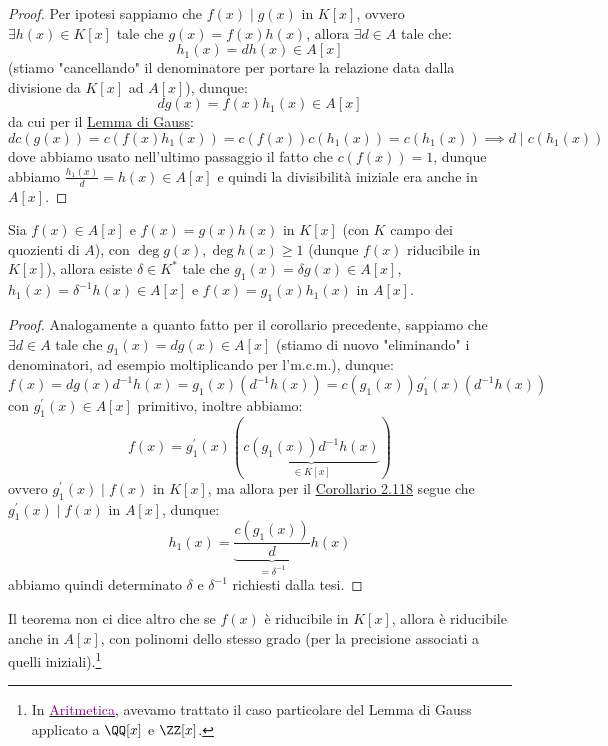 \documentclass[11pt]{scrartcl}
\begin{document}
\begin{proof}
    Per ipotesi sappiamo che $f(x) \mid g(x)$ in $K[x]$, ovvero $\exists h(x) \in K[x]$ tale che $g(x) = f(x)h(x)$, allora $\exists d \in A$ tale che:
    \[ h_1(x) = dh(x) \in A[x]
        \]
    (stiamo "cancellando" il denominatore per portare la relazione data dalla divisione da $K[x]$ ad $A[x]$), dunque:
    \[ dg(x) = f(x)h_1(x) \in A[x]
        \]
    da cui per il \hyperref[gauss]{Lemma di Gauss}:
    \[ dc(g(x)) = c(f(x)h_1(x)) = c(f(x))c(h_1(x)) = c(h_1(x)) \implies d \mid c(h_1(x))
        \]
    dove abbiamo usato nell'ultimo passaggio il fatto che $c(f(x)) = 1$, dunque abbiamo $\displaystyle\frac{h_1(x)}{d} = h(x) \in A[x]$
    e quindi la divisibilità iniziale era anche in $A[x]$. 
\end{proof}

\begin{corollary}
    \label{2.119}
    Sia $f(x) \in A[x]$ e $f(x) = g(x)h(x)$ in $K[x]$ (con $K$ campo dei quozienti di $A$), con $\deg g(x),\deg h(x) \geq 1$ (dunque $f(x)$ riducibile in $K[x]$),
    allora esiste $\delta \in K^*$ tale che $g_1(x) = \delta g(x) \in A[x]$, $h_1(x) = \delta^{-1}h(x) \in A[x]$ e $f(x) = g_1(x)h_1(x)$ in $A[x]$.
\end{corollary}

\begin{proof}
    Analogamente a quanto fatto per il corollario precedente, sappiamo che $\exists d \in A$ tale che $g_1(x) = dg(x) \in A[x]$ (stiamo di nuovo "eliminando" i denominatori, ad esempio moltiplicando per l'm.c.m.),
    dunque:
    \[ f(x) = dg(x)d^{-1}h(x) = g_1(x)(d^{-1}h(x)) = c(g_1(x))g_1^{\prime}(x)(d^{-1}h(x))
        \]
    con $g_1^{\prime}(x) \in A[x]$ primitivo, inoltre abbiamo:
    \[ f(x) = g_1^{\prime}(x)(\underbrace{c(g_1(x))d^{-1}h(x)}_{\in K[x]})
        \]
    ovvero $g_1^{\prime}(x) \mid f(x)$ in $K[x]$, ma allora per il \hyperref[2.118]{Corollario 2.118} segue che $g_1^{\prime}(x) \mid f(x)$ in $A[x]$, dunque:
    \[ h_1(x) = \underbrace{\frac{c(g_1(x))}{d}}_{= \delta^{-1}}h(x)
        \]
    abbiamo quindi determinato $\delta$ e $\delta^{-1}$ richiesti dalla tesi.
\end{proof}

\begin{remark}
    Il teorema non ci dice altro che se $f(x)$ è riducibile in $K[x]$, allora è riducibile anche in $A[x]$, con polinomi dello stesso grado (per la precisione associati a quelli iniziali).\footnote{In
    \href{https://github.com/diego-unipi/Appunti-Aritmetica}{\textcolor{purple}{Aritmetica}}, avevamo trattato il caso particolare del Lemma di Gauss applicato a $\QQ[x]$ e $\ZZ[x]$.}
\end{remark}
\end{document}
